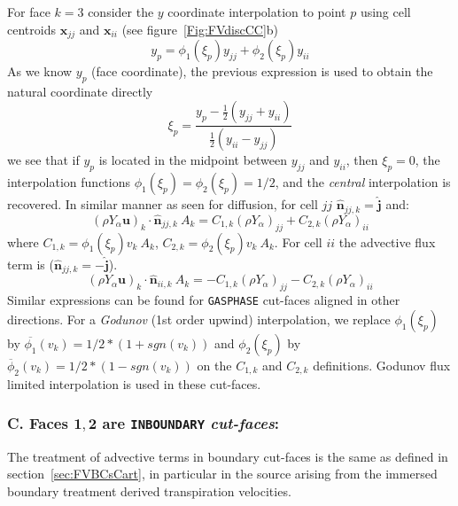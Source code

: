 \documentclass[12pt]{article}
\begin{document}
For face $k=3$ consider the $y$ coordinate interpolation to point $p$ using cell centroids $\mathbf{x}_{jj}$ and $\mathbf{x}_{ii}$ (see  figure~\ref{Fig:FVdiscCC}b) 
%
\begin{equation}
  y_p =  \phi_1(\xi_p) y_{jj} + \phi_2(\xi_p) y_{ii}
\end{equation}
%
As we know $y_p$ (face coordinate), the previous expression is used to obtain the natural coordinate directly
%
\begin{equation}
  \xi_p = \frac{y_p - \frac{1}{2} \left( y_{jj} + y_{ii} \right)}{\frac{1}{2} \left( y_{ii} - y_{jj} \right)}
\end{equation}
%
we see that if $y_p$ is located in the midpoint between $y_{jj}$ and $y_{ii}$, then $\xi_p=0$, the interpolation functions $\phi_1(\xi_p)=\phi_2(\xi_p)=1/2$, and the \textit{central} interpolation is recovered. In similar manner as seen for diffusion, for cell $jj$ 
$\hat{\mathbf{n}}_{jj,k}=\hat{\mathbf{j}}$ and:
%
\begin{equation}
   \left( \rho Y_\alpha \mathbf{u} \right)_k \cdot \hat{\mathbf{n}}_{jj,k} \: A_k = C_{1,k} \left( \rho Y_\alpha \right)_{jj} + C_{2,k} \left( \rho Y_\alpha \right)_{ii} 
\end{equation}
%
where $C_{1,k}=\phi_1(\xi_p) v_k \: A_k$, $C_{2,k}=\phi_2(\xi_p) v_k \: A_k$. For cell $ii$ the advective flux term is 
($\hat{\mathbf{n}}_{jj,k}=-\hat{\mathbf{j}}$). 
%
\begin{equation}
   \left( \rho Y_\alpha \mathbf{u} \right)_k \cdot \hat{\mathbf{n}}_{ii,k} \: A_k = - C_{1,k}  \left( \rho Y_\alpha \right)_{jj} - C_{2,k}  \left( \rho Y_\alpha \right)_{ii} 
\end{equation}
%
Similar expressions can be found for \texttt{GASPHASE} cut-faces aligned in other directions. For a \textit{Godunov} (1st order upwind) interpolation, 
we replace $\phi_1(\xi_p)$ by $\overline{\phi_1}(v_k)=1/2*(1+sgn(v_k))$ and $\phi_2(\xi_p)$ by $\overline{\phi}_2(v_k)=1/2*(1-sgn(v_k))$ on the $C_{1,k}$ and $C_{2,k}$ definitions. Godunov flux limited interpolation is used in these cut-faces.


\subsubsection*{C. Faces $\mathbf{1},\mathbf{2}$ are \texttt{INBOUNDARY} \textit{cut-faces}:}

The treatment of advective terms in boundary cut-faces is the same as defined in section~\ref{sec:FVBCsCart}, in particular in the source arising from the immersed boundary treatment derived transpiration velocities.
\end{document}

